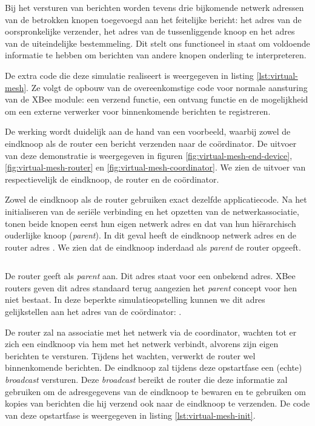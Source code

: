 Bij het versturen van berichten worden tevens drie bijkomende netwerk adressen
van de betrokken knopen toegevoegd aan het feitelijke bericht: het adres van de
oorspronkelijke verzender, het adres van de tussenliggende knoop en het adres
van de uiteindelijke bestemmeling. Dit stelt ons functioneel in staat om
voldoende informatie te hebben om berichten van andere knopen onderling te
interpreteren.

De extra code die deze simulatie realiseert is weergegeven in listing
\ref{lst:virtual-mesh}. Ze volgt de opbouw van de overeenkomstige code voor
normale aansturing van de XBee module: een verzend functie, een ontvang functie
en de mogelijkheid om een externe verwerker voor binnenkomende berichten te
registreren.

De werking wordt duidelijk aan de hand van een voorbeeld, waarbij zowel de
eindknoop als de router een bericht verzenden naar de co\"ordinator. De
uitvoer van deze demonstratie is weergegeven in figuren
\ref{fig:virtual-mesh-end-device}, \ref{fig:virtual-mesh-router} en
\ref{fig:virtual-mesh-coordinator}. We zien de uitvoer van respectievelijk de
eindknoop, de router en de co\"ordinator.

Zowel de eindknoop als de router gebruiken exact dezelfde applicatiecode. Na
het initialiseren van de seri\"ele verbinding en het opzetten van de
netwerkassociatie, tonen beide knopen eerst hun eigen netwerk adres en dat van
hun hi\"erarchisch ouderlijke knoop (\emph{parent}). In dit geval heeft
de eindknoop netwerk adres  en de router adres . We zien
dat de eindknoop inderdaad als \emph{parent} de router opgeeft.

\inputminted[linenos,frame=lines,framesep=2mm,fontsize=\footnotesize,firstline=97,firstnumber=97]{c}{../src/demo/lib/network.c}
\vspace{-5mm}
\vspace{3mm}

De router geeft als \emph{parent}  aan. Dit adres staat voor een
onbekend adres. XBee routers geven dit adres standaard terug aangezien het
\emph{parent} concept voor hen niet bestaat. In deze beperkte
simulatieopstelling kunnen we dit adres gelijkstellen aan het adres van de
co\"ordinator: .

De router zal na associatie met het netwerk via de coordinator, wachten tot er
zich een eindknoop via hem met het netwerk verbindt, alvorens zijn eigen
berichten te versturen. Tijdens het wachten, verwerkt de router wel
binnenkomende berichten. De eindknoop zal tijdens deze opstartfase een (echte)
\emph{broadcast} versturen. Deze \emph{broadcast} bereikt de router die deze
informatie zal gebruiken om de adresgegevens van de eindknoop te bewaren en te
gebruiken om kopies van berichten die hij verzend ook naar de eindknoop te
verzenden. De code van deze opstartfase is weergegeven in listing
\ref{lst:virtual-mesh-init}.

